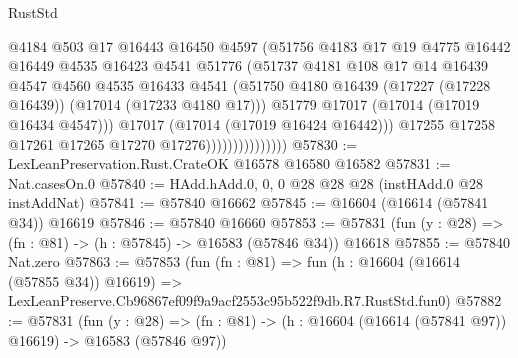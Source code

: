 \begin{lexlean}{RustStd}
\begin{coremodule}
                                  @4184
                                  @503
                                  @17
                                  @16443
                                  @16450
                                  @4597
                                  (@51756
                                    @4183
                                    @17
                                    @19
                                    @4775
                                    @16442
                                    @16449
                                    @4535
                                    @16423
                                    @4541
                                    @51776
                                    (@51737
                                      @4181
                                      @108
                                      @17
                                      @14
                                      @16439
                                      @4547
                                      @4560
                                      @4535
                                      @16433
                                      @4541
                                      (@51750
                                        @4180
                                        @16439
                                        (@17227 (@17228 @16439))
                                        (@17014 (@17233 @4180 @17)))
                                      @51779
                                      @17017
                                      (@17014 (@17019 @16434 @4547)))
                                    @17017
                                    (@17014 (@17019 @16424 @16442)))
                                  @17255
                                  @17258
                                  @17261
                                  @17265
                                  @17270
                                  @17276)))))))))))))))
@57830 := LexLeanPreservation.Rust.CrateOK @16578 @16580 @16582
@57831 := Nat.casesOn.{0}
@57840 := HAdd.hAdd.{0, 0, 0} @28 @28 @28 (instHAdd.{0} @28 instAddNat)
@57841 := @57840 @16662
@57845 := @16604 (@16614 (@57841 @34)) @16619
@57846 := @57840 @16660
@57853 := @57831 (fun (y : @28) => (fn : @81) -> (h : @57845) -> @16583 (@57846 @34)) @16618
@57855 := @57840 Nat.zero
@57863 := @57853
    (fun (fn : @81) =>
    fun (h : @16604 (@16614 (@57855 @34)) @16619) =>
    LexLeanPreserve.Cb96867ef09f9a9acf2553c95b522f9db.R7.RustStd.fun0)
@57882 := @57831
    (fun (y : @28) =>
    (fn : @81) -> (h : @16604 (@16614 (@57841 @97)) @16619) -> @16583 (@57846 @97))

\end{coremodule}
\end{lexlean}
